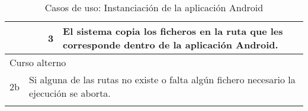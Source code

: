 \begin{center}
\begin{longtable}{ |b{2.5cm}|b{4cm}|b{1cm}|b{2cm}|b{1.5cm}| b{2.5cm}| }
    \hline
     & \multicolumn{2}{|l|}{} & 3 &  \multicolumn{2}{|l|}{\parbox{5cm}{El sistema copia los ficheros en la ruta que les corresponde dentro de la aplicación Android.}}\\
    \hline
    \multicolumn{6}{|l|}{\parbox{8cm}{{\color{RubineRed} Curso alterno }}}  \\ 
    \hline
    2b & \multicolumn{5}{|l|}{\parbox{13cm}{Si alguna de las rutas no existe o falta algún fichero necesario la ejecución se aborta.}}  \\ 
    \hline
    \caption{Casos de uso: Instanciación de la aplicación Android}
  	\label{tab:casos-uso:android}
    \end{longtable}
\end{center}